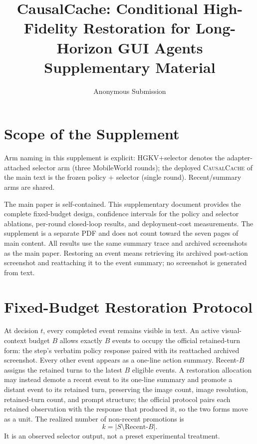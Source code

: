 \documentclass[letterpaper]{article} %
\title{CausalCache: Conditional High-Fidelity Restoration for Long-Horizon
GUI Agents\\Supplementary Material}
\author{Anonymous Submission}
\newcommand{\method}{\textsc{CausalCache}}
\newcommand{\hgkv}{\textsc{HGKV}}
\begin{document}
\maketitle

\section{Scope of the Supplement}

Arm naming in this supplement is explicit: \hgkv{}$+$selector denotes the
adapter-attached selector arm (three MobileWorld rounds); the deployed
\method{} of the main text is the frozen policy $+$ selector (single
round). Recent/summary arms are shared.

The main paper is self-contained. This supplementary document provides the
complete fixed-budget design, confidence intervals for the policy and selector
ablations, per-round closed-loop results, and deployment-cost measurements.
The supplement is a separate PDF and does not count toward the seven pages of
main content. All results use the same summary trace and archived screenshots
as the main paper. Restoring an event means retrieving its archived
post-action screenshot and reattaching it to the event summary; no screenshot
is generated from text.

\section{Fixed-Budget Restoration Protocol}

At decision $t$, every completed event remains visible in text. An active
visual-context budget $B$ allows exactly $B$ events to occupy the official
retained-turn form: the step's verbatim policy response paired with its
reattached archived screenshot. Every other event appears as a one-line
action summary. Recent-$B$ assigns the retained turns to the latest $B$
eligible events. A restoration allocation may instead demote a recent event
to its one-line summary and promote a distant event to its retained turn,
preserving the image count, image resolution, retained-turn count, and
prompt structure; the official protocol pairs each retained observation
with the response that produced it, so the two forms move as a unit. The realized number of
non-recent promotions is
\[
  k=\lvert S\setminus\mathrm{Recent}\text{-}B\rvert .
\]
It is an observed selector output, not a preset experimental treatment.
\end{document}
